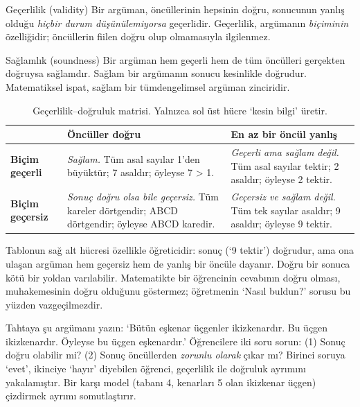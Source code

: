 \begin{tanim}{Geçerlilik (validity)}
Bir argüman, öncüllerinin hepsinin doğru, sonucunun yanlış olduğu \emph{hiçbir durum düşünülemiyorsa} geçerlidir. Geçerlilik, argümanın \emph{biçiminin} özelliğidir; öncüllerin fiilen doğru olup olmamasıyla ilgilenmez.
\end{tanim}

\begin{tanim}{Sağlamlık (soundness)}
Bir argüman hem geçerli hem de tüm öncülleri gerçekten doğruysa sağlamdır. Sağlam bir argümanın sonucu kesinlikle doğrudur. Matematiksel ispat, sağlam bir tümdengelimsel argüman zinciridir.
\end{tanim}

\begin{table}[h]
\centering\small
\renewcommand{\arraystretch}{1.35}
\begin{tabularx}{\linewidth}{>{\raggedright\arraybackslash}p{2.6cm}>{\raggedright\arraybackslash}X>{\raggedright\arraybackslash}X}
\toprule
 & \textbf{Öncüller doğru} & \textbf{En az bir öncül yanlış}\\
\midrule
\textbf{Biçim geçerli} & \cellcolor{grnl}\emph{Sağlam.} Tüm asal sayılar 1’den büyüktür; 7 asaldır; öyleyse 7 > 1. & \emph{Geçerli ama sağlam değil.} Tüm asal sayılar tektir; 2 asaldır; öyleyse 2 tektir. \\[2pt]
\textbf{Biçim geçersiz} & \emph{Sonuç doğru olsa bile geçersiz.} Tüm kareler dörtgendir; ABCD dörtgendir; öyleyse ABCD karedir. & \emph{Geçersiz ve sağlam değil.} Tüm tek sayılar asaldır; 9 asaldır; öyleyse 9 tektir.\\
\bottomrule
\end{tabularx}
\caption{Geçerlilik–doğruluk matrisi. Yalnızca sol üst hücre ‘kesin bilgi’ üretir.}
\end{table}

Tablonun sağ alt hücresi özellikle öğreticidir: sonuç (‘9 tektir’) doğrudur, ama ona ulaşan argüman hem geçersiz hem de yanlış bir öncüle dayanır. Doğru bir sonuca kötü bir yoldan varılabilir. Matematikte bir öğrencinin cevabının doğru olması, muhakemesinin doğru olduğunu göstermez; öğretmenin ‘Nasıl buldun?’ sorusu bu yüzden vazgeçilmezdir.

\begin{sinif}
Tahtaya şu argümanı yazın: ‘Bütün eşkenar üçgenler ikizkenardır. Bu üçgen ikizkenardır. Öyleyse bu üçgen eşkenardır.’ Öğrencilere iki soru sorun: (1) Sonuç doğru olabilir mi? (2) Sonuç öncüllerden \emph{zorunlu olarak} çıkar mı? Birinci soruya ‘evet’, ikinciye ‘hayır’ diyebilen öğrenci, geçerlilik ile doğruluk ayrımını yakalamıştır. Bir karşı model (tabanı 4, kenarları 5 olan ikizkenar üçgen) çizdirmek ayrımı somutlaştırır.
\end{sinif}

